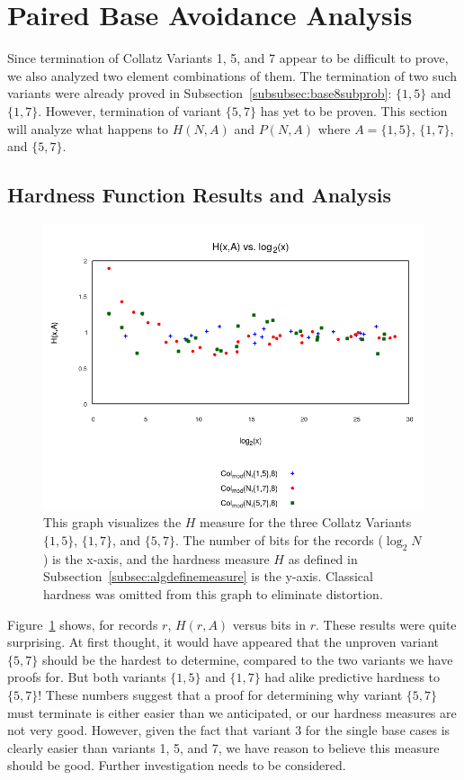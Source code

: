 \section{Paired Base Avoidance Analysis} \label{subsec:algpairedbase}
Since termination of Collatz Variants 1, 5, and 7 appear to be difficult to prove, we also analyzed two element combinations of them. The termination of two such variants were already proved in Subsection~\ref{subsubsec:base8subprob}: $\{1,5\}$ and $\{1,7\}$. However, termination of variant $\{5,7\}$ has yet to be proven. This section will analyze what happens to $H(N,A)$ and $P(N,A)$ where $A=\{1,5\}$, $\{1,7\}$, and $\{5,7\}$.
\subsection{Hardness Function Results and Analysis} \label{subsubsec:algmulhardness}
\begin{figure}
    \centering
    \includegraphics[scale=0.6]{ModAvoidanceAnalysisPics/H_vs_log_multi_base.png}
    \caption{This graph visualizes the $H$ measure for the three Collatz Variants $\{1,5\}$, $\{1,7\}$, and $\{5,7\}$. The number of bits for the records ($\log_2{N}$) is the x-axis, and the hardness measure $H$ as defined in Subsection~\ref{subsec:algdefinemeasure} is the y-axis. Classical hardness was omitted from this graph to eliminate distortion.}
    \label{fig:h_multivslog}
\end{figure}
Figure~\ref{fig:h_multivslog} shows, for records $r$, $H(r,A)$ versus bits in $r$. These results were quite surprising. At first thought, it would have appeared that the unproven variant $\{5, 7\}$ should be the hardest to determine, compared to the two variants we have proofs for. But both variants $\{1, 5\}$ and $\{1, 7\}$  had alike predictive hardness to $\{5, 7\}$! These numbers suggest that a proof for determining why variant $\{5, 7\}$ must terminate is either easier than we anticipated, or our hardness measures are not very good. However, given the fact that variant 3 for the single base cases is clearly easier than variants 1, 5, and 7, we have reason to believe this measure should be good. Further investigation needs to be considered.
